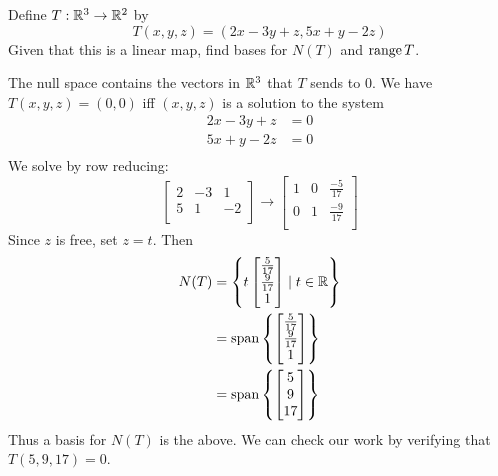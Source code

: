 \documentclass{article}
\DeclareMathOperator{\spn}{span}
\begin{document}
\begin{example}
  Define $T: \mathbb{R}^3 \to \mathbb{R}^2$ by \[
    T(x, y, z) = (2x - 3y + z, 5x + y - 2z)
  \]
  Given that this is a linear map, find bases for $N(T)$ and $\operatorname{\text{range}} T$.

  The null space contains the vectors in $\mathbb{R}^3$ that $T$ sends to $0$. We have $T(x, y, z) = (0, 0)$ iff $(x, y, z)$ is a solution to the system
  \begin{align*}
    2x - 3y + z &= 0\\
    5x + y - 2z &= 0\\
  \end{align*}
  We solve by row reducing:
  \[
    \begin{bmatrix}
      2 & -3 & 1\\
      5 & 1 & -2\\
    \end{bmatrix} \to
    \begin{bmatrix}
      1 & 0 & \frac{-5}{17}\\
      0 & 1 & \frac{-9}{17}\\
    \end{bmatrix}
  \]
  Since $z$ is free, set $z = t$. Then
  \begin{align*}
    N(T) &= \left\{ t
      \begin{bmatrix}
        \frac{5}{17}\\
        \frac{9}{17}\\
        1\\
    \end{bmatrix} \mid t \in \R \right\}\\
    &= \spn \left\{
      \begin{bmatrix}
        \frac{5}{17}\\
        \frac{9}{17}\\
        1\\
    \end{bmatrix} \right\}\\
    &= \spn \left\{
      \begin{bmatrix}
        5\\9\\17\\
    \end{bmatrix}\right\}
  \end{align*}
  Thus a basis for $N(T)$ is the above. We can check our work by verifying that $T(5, 9, 17) = 0$.


\end{example}
\end{document}
